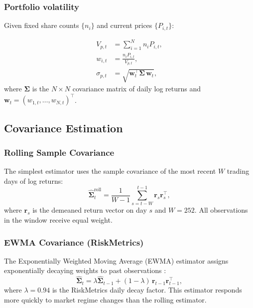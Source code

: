\documentclass[12pt, a4paper]{article}
\begin{document}
\subsubsection*{Portfolio volatility}

Given fixed share counts $\{n_i\}$ and current prices $\{P_{i,t}\}$:

\begin{align}
  V_{p,t}   &= \sum_{i=1}^{N} n_i P_{i,t},
  \label{eq:port_value} \\[4pt]
  w_{i,t}   &= \frac{n_i P_{i,t}}{V_{p,t}},
  \label{eq:dyn_weight} \\[4pt]
  \sigma_{p,t} &= \sqrt{\bm{w}_t^\top \bm{\Sigma} \, \bm{w}_t},
  \label{eq:port_vol}
\end{align}
where $\bm{\Sigma}$ is the $N \times N$ covariance matrix of daily log
returns and $\bm{w}_t = (w_{1,t}, \ldots, w_{N,t})^\top$.

\subsection{Covariance Estimation}

\subsubsection{Rolling Sample Covariance}

The simplest estimator uses the sample covariance of the most recent
$W$ trading days of log returns:
\begin{equation}
  \hat{\bm{\Sigma}}^{\mathrm{roll}}_t
    = \frac{1}{W-1} \sum_{s=t-W}^{t-1}
        \bm{r}_s \bm{r}_s^\top,
  \label{eq:roll_cov}
\end{equation}
where $\bm{r}_s$ is the demeaned return vector on day $s$ and $W = 252$.
All observations in the window receive equal weight.

\subsubsection{EWMA Covariance (RiskMetrics)}

The Exponentially Weighted Moving Average (EWMA) estimator assigns
exponentially decaying weights to past observations \citep{riskmetrics1996}:
\begin{equation}
  \hat{\bm{\Sigma}}_t
    = \lambda \hat{\bm{\Sigma}}_{t-1}
    + (1 - \lambda)\, \bm{r}_{t-1} \bm{r}_{t-1}^\top,
  \label{eq:ewma_cov}
\end{equation}
where $\lambda = 0.94$ is the RiskMetrics daily decay factor.  This
estimator responds more quickly to market regime changes than the rolling
estimator.
\end{document}
